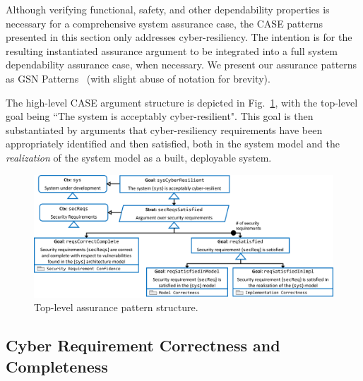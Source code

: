 Although verifying functional, safety, and other dependability properties is necessary for a comprehensive system assurance case, the CASE patterns presented in this section only addresses cyber-resiliency.  The intention is for the resulting instantiated assurance argument to be integrated into a full system dependability assurance case, when necessary.  We present our assurance patterns as GSN Patterns~\cite{Kelly97:patterns} (with slight abuse of notation for brevity).

The high-level CASE argument structure is depicted in Fig.~\ref{fig:top-level},
with the top-level goal being ``The system is acceptably cyber-resilient".  
This goal is then substantiated by arguments that cyber-resiliency requirements have been appropriately identified and then satisfied, both in the system model and the \textit{realization} of the system model as a built, deployable system.

\begin{figure}[h] 
	\centering 
	\includegraphics[width=\textwidth]{figs/top-level.png}
	\caption{Top-level assurance pattern structure.}
	\label{fig:top-level} 
\end{figure}
\vspace{-3mm}

\subsection{Cyber Requirement Correctness and Completeness}

